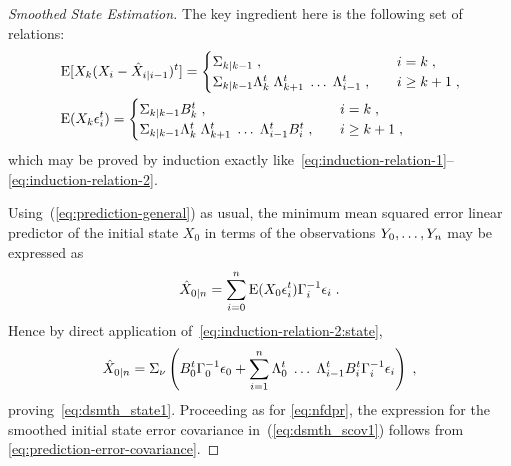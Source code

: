 \begin{proof}[Smoothed State Estimation]
The key ingredient here is the following set of relations:
\begin{align}
\label{eq:induction-relation-1:state}
& \operatorname{E}[X_k(X_i - \hat{X}_{i|i-1})^t]= \begin{cases}
\Sigma_{k|k-1} \;, & \quad i=k \;, \\
\Sigma_{k|k-1} \Lambda_{k}^t \; \Lambda_{k+1}^t \; \dotsc \; \Lambda_{i-1}^t
\;, & \quad i \geq k+1 \;,\\
\end{cases} \\
\label{eq:induction-relation-2:state}
& \operatorname{E}(X_k \epsilon_i^t) = \begin{cases}
\Sigma_{k|k-1} B_{k}^t \;, & \quad i = k \;, \\
\Sigma_{k|k-1} \Lambda_{k}^t \; \Lambda_{k+1}^t \; \dotsc \; \Lambda_{i-1}^t B_i^t \;, & \quad i \geq k+1 \;,
\end{cases}
\end{align}
which may be proved by induction exactly like~\eqref{eq:induction-relation-1}--\eqref{eq:induction-relation-2}.

Using~(\ref{eq:prediction-general}) as usual, the minimum mean squared error linear predictor of the initial state $X_0$ in terms of the observations $Y_0, \ldots, Y_n$ may be expressed as
\begin{equation}
  \label{eq:cov_init_state_innov}
  \hat{X}_{0|n} = \sum_{i=0}^n \operatorname{E}(X_0 \epsilon_i^t) \Gamma^{-1}_i \epsilon_i \; .
\end{equation}
Hence by direct application of~\eqref{eq:induction-relation-2:state},
\begin{equation}
 \hat{X}_{0|n} = \Sigma_{\nu} \left( B_0^t \Gamma_0^{-1} \epsilon_0 + \sum_{i=1}^n \Lambda^t_0 \; \dots \; \Lambda^t_{i-1} B_i^t \Gamma_{i}^{-1} \epsilon_i \right) \; ,
\end{equation}
proving~\eqref{eq:dsmth_state1}. Proceeding as for \eqref{eq:nfdpr}, the expression for the smoothed initial state error covariance in~(\ref{eq:dsmth_scov1}) follows from \eqref{eq:prediction-error-covariance}.


\end{proof}
